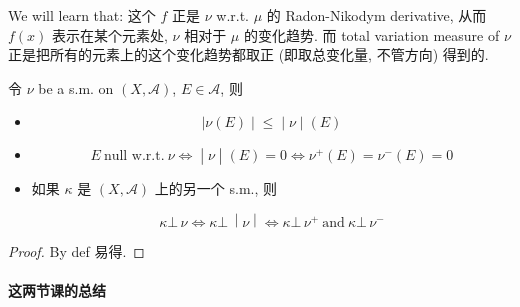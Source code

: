 We will learn that: 这个 \(f\) 正是 \(\nu\) w.r.t. \(\mu\) 的 Radon-Nikodym derivative, 从而 \(f(x)\) 表示在某个元素处, \(\nu\) 相对于 \(\mu\) 的变化趋势. 而 total variation measure of \(\nu\) 正是把所有的元素上的这个变化趋势都取正 (即取总变化量, 不管方向) 得到的.

\begin{lemma}{}

令 \(\nu\) be a s.m. on \((X,\mathcal{A})\), \(E \in \mathcal{A}\), 则

\begin{itemize}
\item
  \[\left. |\nu(E) \middle| \leq \middle| \nu \middle| (E) \right.\]
\item
  \[\left. E\ \text{null w.r.t.}\ \nu\Leftrightarrow \middle| \nu \middle| (E) = 0\Leftrightarrow\nu^{+}(E) = \nu^{-}(E) = 0 \right.\]
\item
  如果 \(\kappa\) 是 \((X,\mathcal{A})\) 上的另一个 s.m., 则

  \[\left. \kappa\bot\,\nu\Leftrightarrow\kappa\bot\, \middle| \nu \middle| \Leftrightarrow\kappa\bot\,\nu^{+}\ \text{and}\ \kappa\bot\,\nu^{-} \right.\]
\end{itemize}

\end{lemma}

\begin{proof}

By def 易得.

\end{proof}

\paragraph{这两节课的总结}\label{ux8fd9ux4e24ux8282ux8bfeux7684ux603bux7ed3}

